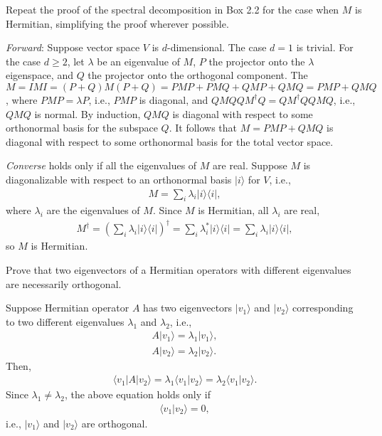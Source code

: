 \documentclass[en]{sol-man}
\begin{document}
\begin{exe}
    Repeat the proof of the spectral decomposition in Box 2.2 for the case when $M$ is Hermitian, simplifying the proof wherever possible.
\end{exe}
\begin{pf}
    \emph{Forward}: Suppose vector space $V$ is $d$-dimensional.
    The case $d=1$ is trivial.
    For the case $d\geq 2$, let $\lambda$ be an eigenvalue of $M$, $P$ the projector onto the $\lambda$ eigenspace, and $Q$ the projector onto the orthogonal component. The $M=IMI=(P+Q)M(P+Q)=PMP+PMQ+QMP+QMQ=PMP+QMQ$, where $PMP=\lambda P$, i.e., $PMP$ is diagonal, and $QMQQM^{\dagger}Q=QM^{\dagger}QQMQ$, i.e., $QMQ$ is normal. By induction, $QMQ$ is diagonal with respect to some orthonormal basis for the subspace $Q$. It follows that $M=PMP+QMQ$ is diagonal with respect to some orthonormal basis for the total vector space.

    \emph{Converse} holds only if all the eigenvalues of $M$ are real. Suppose $M$ is diagonalizable with respect to an orthonormal basis $\lvert i\rangle$ for $V$, i.e.,
    \begin{align}
        M=\sum_i\lambda_i\lvert i\rangle\langle i\rvert,
    \end{align}
    where $\lambda_i$ are the eigenvalues of $M$.
    Since $M$ is Hermitian, all $\lambda_i$ are real,
    \begin{align}
        M^{\dagger}=\left(\sum_i\lambda_i\lvert i\rangle\langle i\rvert\right)^{\dagger}=\sum_i\lambda_i^*\lvert i\rangle\langle i\rvert=\sum_i\lambda_i\lvert i\rangle\langle i\rvert,
    \end{align}
    so $M$ is Hermitian.
\end{pf}

\begin{exe}
    Prove that two eigenvectors of a Hermitian operators with different eigenvalues are necessarily orthogonal.
\end{exe}
\begin{pf}
    Suppose Hermitian operator $A$ has two eigenvectors $\lvert v_1\rangle$ and $\lvert v_2\rangle$ corresponding to two different eigenvalues $\lambda_1$ and $\lambda_2$, i.e.,
    \begin{align}
        A\lvert v_1\rangle=\lambda_1\lvert v_1\rangle,\\
        A\lvert v_2\rangle=\lambda_2\lvert v_2\rangle.
    \end{align}
    Then,
    \begin{align}
        \langle v_1\rvert A\lvert v_2\rangle=\lambda_1\langle v_1\vert v_2\rangle=\lambda_2\langle v_1\vert v_2\rangle.
    \end{align}
    Since $\lambda_1\neq\lambda_2$, the above equation holds only if
    \begin{align}
        \langle v_1\vert v_2\rangle=0,
    \end{align}
    i.e., $\lvert v_1\rangle$ and $\lvert v_2\rangle$ are orthogonal.
\end{pf}
\end{document}
